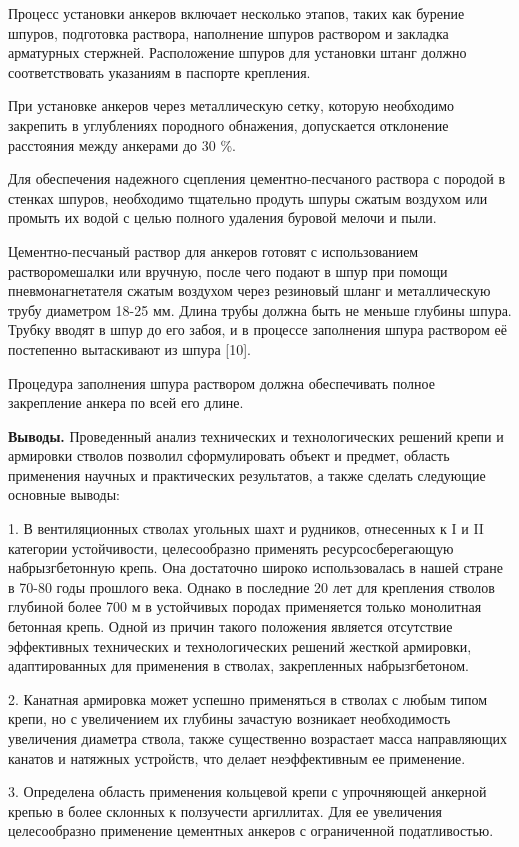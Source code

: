 Процесс установки анкеров включает несколько этапов, таких как бурение
шпуров, подготовка раствора, наполнение шпуров раствором и закладка
арматурных стержней. Расположение шпуров для установки штанг должно
соответствовать указаниям в паспорте крепления.

При установке анкеров через металлическую сетку, которую необходимо
закрепить в углублениях породного обнажения, допускается отклонение
расстояния между анкерами до 30 \%.

Для обеспечения надежного сцепления цементно-песчаного раствора с
породой в стенках шпуров, необходимо тщательно продуть шпуры сжатым
воздухом или промыть их водой с целью полного удаления буровой мелочи и
пыли.

Цементно-песчаный раствор для анкеров готовят с использованием
растворомешалки или вручную, после чего подают в шпур при помощи
пневмонагнетателя сжатым воздухом через резиновый шланг и металлическую
трубу диаметром 18-25 мм. Длина трубы должна быть не меньше глубины
шпура. Трубку вводят в шпур до его забоя, и в процессе заполнения шпура
раствором её постепенно вытаскивают из шпура {[}10{]}.

Процедура заполнения шпура раствором должна обеспечивать полное
закрепление анкера по всей его длине.

{\bfseries Выводы.} Проведенный анализ технических и технологических
решений крепи и армировки стволов позволил сформулировать объект и
предмет, область применения научных и практических результатов, а также
сделать следующие основные выводы:

1. В вентиляционных стволах угольных шахт и рудников, отнесенных к I и
II категории устойчивости, целесообразно применять ресурсосберегающую
набрызгбетонную крепь. Она достаточно широко использовалась в нашей
стране в 70-80 годы прошлого века. Однако в последние 20 лет для
крепления стволов глубиной более 700 м в устойчивых породах применяется
только монолитная бетонная крепь. Одной из причин такого положения
является отсутствие эффективных технических и технологических решений
жесткой армировки, адаптированных для применения в стволах, закрепленных
набрызгбетоном.

2. Канатная армировка может успешно применяться в стволах с любым типом
крепи, но с увеличением их глубины зачастую возникает необходимость
увеличения диаметра ствола, также существенно возрастает масса
направляющих канатов и натяжных устройств, что делает неэффективным ее
применение.

3. Определена область применения кольцевой крепи с упрочняющей анкерной
крепью в более склонных к ползучести аргиллитах. Для ее увеличения
целесообразно применение цементных анкеров с ограниченной податливостью.

